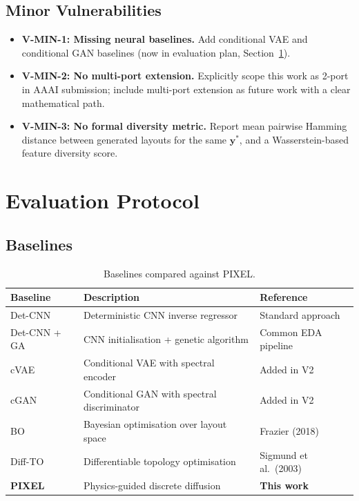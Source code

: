 \documentclass[12pt,a4paper]{article}
\newcommand{\ystar}{\mathbf{y}^{*}}
\theoremstyle{definition}
\theoremstyle{plain}
\theoremstyle{remark}
\begin{document}
\subsection{Minor Vulnerabilities}

\begin{itemize}
  \item \textbf{V-MIN-1: Missing neural baselines.}
        Add conditional VAE and conditional GAN baselines (now in evaluation plan,
        Section~\ref{sec:eval}).
  \item \textbf{V-MIN-2: No multi-port extension.}
        Explicitly scope this work as 2-port in AAAI submission;
        include multi-port extension as future work with a clear mathematical path.
  \item \textbf{V-MIN-3: No formal diversity metric.}
        Report mean pairwise Hamming distance between generated layouts for the same
        $\ystar$, and a Wasserstein-based feature diversity score.
\end{itemize}

\section{Evaluation Protocol}
\label{sec:eval}

\subsection{Baselines}

\begin{table}[H]
\centering
\caption{Baselines compared against PIXEL.}
\label{tab:baselines}
\begin{tabular}{lll}
\toprule
\textbf{Baseline} & \textbf{Description} & \textbf{Reference} \\
\midrule
Det-CNN       & Deterministic CNN inverse regressor          & Standard approach \\
Det-CNN + GA  & CNN initialisation + genetic algorithm       & Common EDA pipeline \\
cVAE          & Conditional VAE with spectral encoder        & Added in V2 \\
cGAN          & Conditional GAN with spectral discriminator  & Added in V2 \\
BO            & Bayesian optimisation over layout space      & Frazier (2018) \\
Diff-TO       & Differentiable topology optimisation         & Sigmund et al.\ (2003) \\
\textbf{PIXEL}& Physics-guided discrete diffusion            & \textbf{This work} \\
\bottomrule
\end{tabular}
\end{table}
\end{document}
